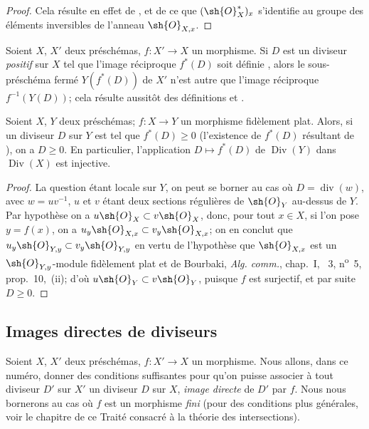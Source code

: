 \begin{proof}
Cela résulte en effet de ,  et de ce que $(\sh{O}_X^*)_x$ s'identifie au groupe des éléments inversibles de l'anneau $\sh{O}_{X,x}$.
\end{proof}

\begin{env}[21.4.7]
\label{IV.21.4.7}
Soient $X$, $X'$ deux préschémas, $f:X'\to X$ un morphisme.
Si $D$ est un diviseur \emph{positif} sur $X$ tel que l'image réciproque $f^*(D)$ soit définie , alors le sous-préschéma fermé $Y(f^*(D))$ de $X'$ n'est autre que l'image réciproque $f^{-1}(Y(D))$;
cela résulte aussitôt des définitions  et .
\end{env}

\begin{proposition}[21.4.8]
\label{IV.21.4.8}
Soient $X$, $Y$ deux préschémas;
$f:X\to Y$ un morphisme fidèlement plat.
Alors, si un diviseur $D$ sur $Y$ est tel que $f^*(D)\geq0$ (l'existence de $f^*(D)$ résultant de ), on a $D\geq0$.
En particulier, l'application $D\mapsto f^*(D)$ de $\operatorname{Div}(Y)$ dans $\operatorname{Div}(X)$ est injective.
\end{proposition}

\begin{proof}
La question étant locale sur $Y$, on peut se borner au cas où $D=\operatorname{div}(w)$, avec $w=uv^{-1}$, $u$ et $v$ étant deux sections régulières de $\sh{O}_Y$ au-dessus de $Y$.
Par hypothèse on a $u\sh{O}_X\subset v\sh{O}_X$, donc, pour tout $x\in X$, si l'on pose $y=f(x)$, on a $u_y\sh{O}_{X,x}\subset v_y\sh{O}_{X,x}$;
on en conclut que $u_y\sh{O}_{Y,y}\subset v_y\sh{O}_{Y,y}$ en vertu de l'hypothèse que $\sh{O}_{X,x}$ est un $\sh{O}_{Y,y}$-module fidèlement plat et de Bourbaki, \emph{Alg. comm.}, chap.~I, \textsection~3, n\textsuperscript{o}~5, prop.~10,~(ii);
d'où $u\sh{O}_Y\subset v\sh{O}_Y$, puisque $f$ est surjectif, et par suite $D\geq0$.
\end{proof}

\subsection{Images directes de diviseurs}
\label{subsection:IV.21.5}
\label{IV.21.5}

\begin{env}[21.5.1]
\label{IV.21.5.1}
Soient $X$, $X'$ deux préschémas, $f:X'\to X$ un morphisme.
Nous allons, dans ce numéro, donner des conditions suffisantes pour qu'on puisse associer à tout diviseur $D'$ sur $X'$ un diviseur $D$ sur $X$, \emph{image directe} de $D'$ par $f$.
Nous nous bornerons au cas où $f$ est un morphisme \emph{fini} (pour des conditions plus générales, voir le chapitre de ce Traité consacré à la théorie des intersections).
\end{env}

